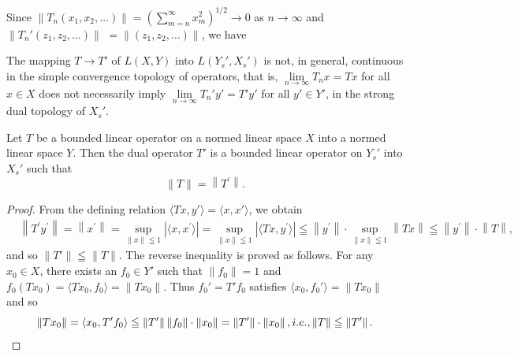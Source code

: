 Since $\|T_n(x_1, x_2, \ldots)\| = \left(\sum\limits_{m=n}^{\infty} x_m^2\right)^{1/2} \to 0$ as $n \to \infty$ and $\|T_n'(z_1, z_2, \ldots)\|$ $= \|(z_1, z_2, \ldots)\|$, we have 

\begin{proposition}\label{prop:VII.1.Proposition.1} The mapping $T \to T'$ of $L(X, Y)$ into $L(Y_s', X_s')$ is not, in general, continuous in the simple convergence topology of operators, that is, $\lim\limits_{n \to \infty} T_n x = Tx$ for all $x \in X$ does not necessarily imply $\lim\limits_{n \to \infty} T_n' y' = T'y'$ for all $y' \in Y'$, in the strong dual topology of $X_s'$. 
\end{proposition}

\begin{theoremn}\label{thm:VII.1.Theorem.2prime} Let $T$ be a bounded linear operator on a normed linear space $X$ into a normed linear space $Y$. Then the dual operator $T'$ is a bounded linear operator on $Y_s'$ into $X_s'$ such that 
\begin{equation}\label{eq:VII.1.3}
\| T \| = \left\| T ^{\prime} \right\|.
\end{equation}
\end{theoremn}

\begin{proof}
 From the defining relation $\langle Tx, y'\rangle = \langle x, x'\rangle$, we obtain 
\[
\begin{aligned}
&\left\| T ^{\prime} y ^{\prime} \right\| = \left\| x ^{\prime} \right\| = \sup\limits _{\| x \| \leqq 1} \left| \langle x, x ^{\prime} \rangle \right| = \sup\limits _{\| x \| \leqq 1} \left| \langle T x, y ^{\prime} \rangle \right| \leqq \left\| y ^{\prime} \right\| \cdot \sup\limits _{\| x \| \leqq 1} \left\| T x \right\| \leqq \left\| y ^{\prime} \right\| \cdot \left\| T \right\|,
\end{aligned}
\]
and so $\| T' \| \leqq \| T \|$. The reverse inequality is proved as follows. For any $x_0 \in X$, there exists an $f_0 \in Y'$ such that $\| f_0 \| = 1$ and $f_0(Tx_0) = \langle Tx_0, f_0 \rangle = \| Tx_0 \|$. Thus $f_0' = T'f_0$ satisfies $\langle x_0, f_0' \rangle = \| Tx_0 \|$ and so 
\begin{equation}\left\| T x _{0} \right\| = \left\langle x _{0}, T ^{\prime} f _{0} \right\rangle \leqq \left\| T ^{\prime} \right\| \left\| f _{0} \right\| \cdot \left\| x _{0} \right\| = \left\| T ^{\prime} \right\| \cdot \left\| x _{0} \right\|, i. e., \left\| T \right\| \leqq \left\| T ^{\prime} \right\|. \notag\end{equation}
\end{proof}

